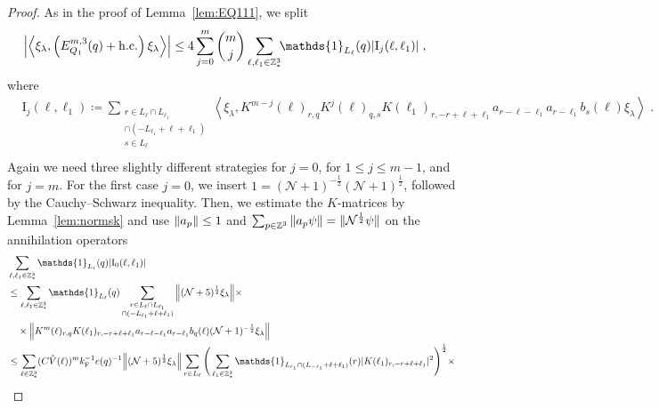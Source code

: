 \documentclass[12pt,a4paper]{article}
\numberwithin{equation}{section}
\newcommand{\cN}{\mathcal{N}}
\newcommand{\1}{\mathbb{I}}
\newcommand{\F}{\mathrm{F}}
\newcommand{\I}{\mathrm{I}}
\newcommand{\Z}{\mathbb{Z}}
\newcommand{\NN}{\mathcal{N}}
\newcommand{\half}{\frac{1}{2}}
\newcommand{\eva}[1]{\left\langle #1 \right\rangle}
\theoremstyle{plain}
\theoremstyle{definition}
\theoremstyle{remark}
\theoremstyle{plain}
\theoremstyle{definition}
\theoremstyle{remark}
\begin{document}
\begin{proof}
As in the proof of Lemma~\ref{lem:EQ111}, we split
\begin{equation} \label{eq:EQ1121}
\begin{aligned}
	& \abs{\eva{\xi_\lambda,\left(E^{m,3}_{Q_1}(q) + \mathrm{h.c.}\right) \xi_\lambda }}
	\le 4 \sum_{j=0}^m {{m}\choose j} \sum_{\ell,\ell_1 \in \Z^3_*}\!\! \mathds{1}_{L_\ell}(q) |\I_j(\ell, \ell_1)| \;,
	\end{aligned}
\end{equation}
where
\begin{equation}
\begin{aligned}
	& \I_j(\ell, \ell_1)
	\coloneq \sum_{\substack{r\in L_{\ell} \cap L_{\ell_1}\\ \cap (-L_{\ell_1}+\ell+\ell_1)\\ s \in L_{\ell}}}
		\eva{\xi_\lambda, K^{m-j}(\ell)_{r,q} K^{j}(\ell)_{q,s}K(\ell_1)_{r,-r+\ell+\ell_1} a_{r-\ell-\ell_1} a_{r-\ell_1} b_{s}(\ell) \xi_\lambda} \;. \\
\end{aligned}
\end{equation}
Again we need three slightly different strategies for $ j = 0 $, for $ 1 \le j \le m-1 $, and for $ j = m $. For the first case $ j = 0 $, we insert $1 = (\NN+1)^{-\half}(\NN+1)^{\half}$, followed by the Cauchy--Schwarz inequality. Then, we estimate the $ K $-matrices by Lemma~\ref{lem:normsk} and use $ \norm{a_p} \le 1 $ and $ \sum_{p \in \Z^3} \norm{a_p \psi} = \Vert \cN^\half \psi \Vert $ on the annihilation operators
\begin{align}
	&\sum_{\ell,\ell_1 \in \Z^3_*} \mathds{1}_{L_\ell}(q) |\I_0(\ell, \ell_1)| \nonumber\\
	&\leq \sum_{\ell,\ell_1 \in \Z^3_*} \mathds{1}_{L_\ell}(q) \sum\limits_{\substack{r\in L_{\ell} \cap L_{\ell_1}\\ \cap (-L_{\ell_1}+\ell+\ell_1)}}
		\norm{ (\NN+5)^{\half} \xi_\lambda} \times \nonumber\\
	&\quad \times \norm{ K^m(\ell )_{r,q} K(\ell_1)_{r,-r+\ell+\ell_1} a_{r-\ell-\ell_1} a_{r-\ell_1} b_{q}(\ell) (\NN+1)^{-\half} \xi_\lambda }\nonumber\\
	 &\leq \sum_{\ell \in \Z^3_*} (C \hat{V}(\ell))^m k_{\F}^{-1} e(q)^{-1}
	 	\norm{ (\NN+5)^{\half} \xi_\lambda}
	 	\sum_{r \in L_\ell} \Bigg( \sum_{\ell_1 \in \Z^3_*} \mathds{1}_{L_{\ell_1} \cap (L_{-\ell_1}+\ell+\ell_1)}(r) |K(\ell_1)_{r,-r+\ell+\ell_1}|^2 \Bigg)^{\half} \times \nonumber\\

\end{align}
\end{proof}
\end{document}
